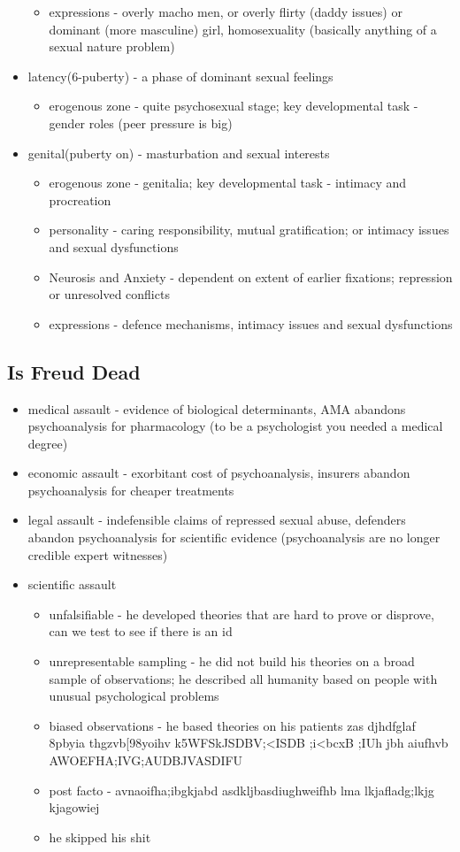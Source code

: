 \documentclass{article}
\begin{document}
\begin{itemize}
\begin{itemize}
\item expressions - overly macho men, or overly flirty (daddy issues) or dominant (more masculine) girl, homosexuality (basically anything of a sexual nature problem)
\end{itemize}
\item latency(6-puberty) - a phase of dominant sexual feelings
\begin{itemize}
\item erogenous zone - quite psychosexual stage; key developmental task - gender roles (peer pressure is big)
\end{itemize}
\item genital(puberty on) - masturbation and sexual interests 
\begin{itemize}
\item erogenous zone - genitalia; key developmental task - intimacy and procreation
\item personality - caring responsibility, mutual gratification; or intimacy issues and sexual dysfunctions
\item Neurosis and Anxiety - dependent on extent of earlier fixations; repression or unresolved conflicts
\item expressions - defence mechanisms, intimacy issues and sexual dysfunctions
\end{itemize}
\end{itemize}
\subsection*{Is Freud Dead}
\begin{itemize}
\item medical assault - evidence of biological determinants, AMA abandons psychoanalysis for pharmacology (to be a psychologist you needed a medical degree)
\item economic assault - exorbitant cost of psychoanalysis, insurers abandon psychoanalysis for cheaper treatments
\item legal assault - indefensible claims of repressed sexual abuse, defenders abandon psychoanalysis for scientific evidence (psychoanalysis are no longer credible expert witnesses)
\item scientific assault
\begin{itemize}
\item unfalsifiable - he developed theories that are hard to prove or disprove, can we test to see if there is an id
\item unrepresentable sampling - he did not build his theories on a broad sample of observations; he described all humanity based on people with unusual psychological problems
\item biased observations - he based theories on his patients zas djhdfglaf  8pbyia thgzvb[98yoihv	k5WFSkJSDBV;<ISDB ;i<bcxB ;IUh jbh aiufhvb AWOEFHA;IVG;AUDBJVASDIFU	
\item post facto - avnaoifha;ibgkjabd asdkljbasdiughweifhb lma lkjafladg;lkjg  kjagowiej
\item he skipped his shit
\end{itemize} 
\end{itemize}
\end{document}
